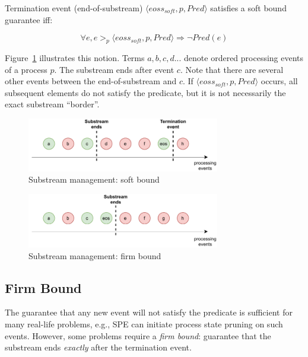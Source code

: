 \begin{definition}
Termination event (end-of-substream) $\langle eoss_{soft}, p, Pred\rangle$ satisfies a soft bound guarantee iff:

\begin{equation}
\forall e, e >_p \langle eoss_{soft}, p, Pred\rangle \Rightarrow \neg Pred(e)
\end{equation}
\end{definition}

Figure~\ref{general_guarantees} illustrates this notion. Terms $a,b,c,d...$ denote ordered processing events of a process $p$. The substream ends after event $c$. Note that there are several other events between the end-of-substream and $c$. If $\langle eoss_{soft}, p, Pred\rangle$ occurs, all subsequent elements do not satisfy the predicate, but it is not necessarily the exact substream ``border''.

\begin{figure}[t]
  \centering
  \includegraphics[width=0.75\textwidth]{Chapters/SubstreamConsistency/pics/general-guarantee.pdf}
  \caption{Substream management: soft bound}
  \label{general_guarantees}
\end{figure}

\begin{figure}[t]
  \centering
  \includegraphics[width=0.75\textwidth]{Chapters/SubstreamConsistency/pics/strict-guarantee.pdf}
  \caption{Substream management: firm bound}
  \label{strict_guarantees}
\end{figure}

\subsection{Firm Bound}

The guarantee that any new event will not satisfy the predicate is sufficient for many real-life problems, e.g., SPE can initiate process state pruning on such events. However, some problems require a {\em firm bound}: guarantee that the substream ends {\em exactly} after the termination event. 

